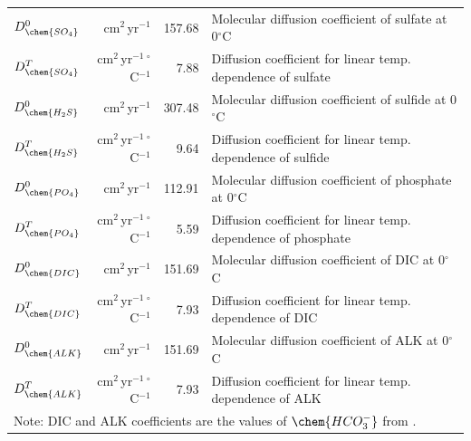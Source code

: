 \documentclass[gmd, manuscript]{copernicus}
\begin{document}
\begin{table}[hbtp]
\begin{tabular}{l r r l}
$D_{\chem{SO_4}}^0$ & cm$^2$\,yr$^{-1}$ & 157.68 &Molecular diffusion coefficient of sulfate at 0$^\circ$C\\
$D_{\chem{SO_4}}^T$ & cm$^2$\,yr$^{-1}$\,${}^{\circ}$C$^{-1}$ & 7.88 &Diffusion coefficient for linear temp. dependence of sulfate\\ %
$D_{\chem{H_2S}}^0$ & cm$^2$\,yr$^{-1}$ & 307.48 & Molecular diffusion coefficient of sulfide at 0$^\circ$C\\
$D_{\chem{H_2S}}^T$ & cm$^2$\,yr$^{-1}$\,${}^{\circ}$C$^{-1}$ & 9.64 & Diffusion coefficient for linear temp. dependence of sulfide\\ %
$D_{\chem{PO_4}}^0$ & cm$^2$\,yr$^{-1}$ & 112.91 &Molecular diffusion coefficient of phosphate at 0$^\circ$C\\
$D_{\chem{PO_4}}^T$ & cm$^2$\,yr$^{-1}$\,${}^{\circ}$C$^{-1}$ & 5.59 &Diffusion coefficient for linear temp. dependence of phosphate\\ %
$D_{\chem{DIC}}^0$ & cm$^2$\,yr$^{-1}$ & 151.69  &Molecular diffusion coefficient of DIC at 0$^\circ$C\\
$D_{\chem{DIC}}^T$ & cm$^2$\,yr$^{-1}$\,${}^{\circ}$C$^{-1}$ & 7.93  &Diffusion coefficient for linear temp. dependence of DIC\\ 
$D_{\chem{ALK}}^0$ & cm$^2$\,yr$^{-1}$ & 151.69  &Molecular diffusion coefficient of ALK at 0$^\circ$C\\
$D_{\chem{ALK}}^T$ & cm$^2$\,yr$^{-1}$\,${}^{\circ}$C$^{-1}$ & 7.93 &Diffusion coefficient for linear temp. dependence of ALK\\ 
\multicolumn{4}{l}{Note: DIC and ALK coefficients are the values of $\chem{HCO_3^{-}}$ from \citet{schulz_quantification_2006}.}\\
\hline\hline
\end{tabular}
\label{table:sed-charac_transport-parameters}
\end{table}
\end{document}
